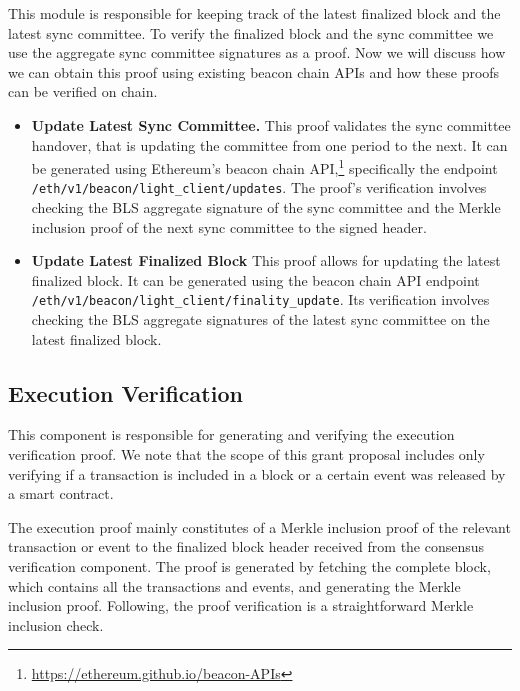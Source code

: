 This module is responsible for keeping track of the latest finalized block and
the latest sync committee. To verify the finalized block and the sync committee 
we use the aggregate sync committee signatures as a proof. Now we will discuss
how we can obtain this proof using existing beacon chain APIs and how these proofs
can be verified on chain.
\begin{itemize}
    \item \textbf{Update Latest Sync Committee.} This proof validates the sync
        committee handover, that is updating the committee from one period to
        the next. It can be generated using Ethereum's beacon chain API,\footnote{\url{https://ethereum.github.io/beacon-APIs}}
        specifically the endpoint\\
        \texttt{/eth/v1/beacon/light\_client/updates}.
        The proof's verification involves checking the BLS aggregate signature
        of the sync committee and the Merkle inclusion proof of the next sync
        committee to the signed header.
    \item \textbf{Update Latest Finalized Block} This proof allows for updating
        the latest finalized block. It can be generated using the beacon chain
        API endpoint\\\texttt{/eth/v1/beacon/light\_client/finality\_update}.
        Its verification involves checking the BLS aggregate signatures of the
        latest sync committee on the latest finalized block.
\end{itemize}

\subsection{Execution Verification}

This component is responsible for generating and verifying the execution
verification proof. We note that the scope of this grant proposal includes only
verifying if a transaction is included in a block or a certain event was
released by a smart contract. 

The execution proof mainly constitutes of a Merkle inclusion proof of the
relevant transaction or event to the finalized block header received from the
consensus verification component. The proof is generated by fetching the
complete block, which contains all the transactions and events, and generating
the Merkle inclusion proof. Following, the proof verification is a
straightforward Merkle inclusion check.
